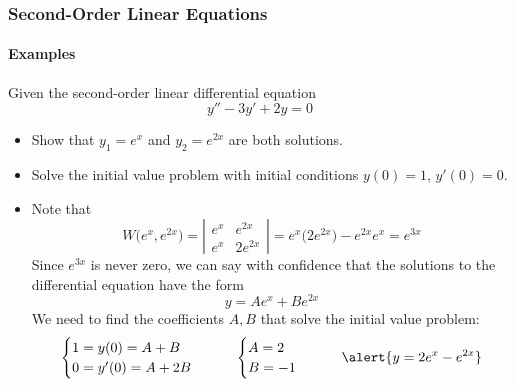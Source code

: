 \documentclass[9pt,xcolor=x11names,compress]{beamer}
\begin{document}
\begin{frame}\frametitle{Second-Order Linear Equations}
\framesubtitle{Examples}
\begin{block}{Given the second-order linear differential equation}
\begin{equation*}
	y''-3y'+2y=0
\end{equation*}
\begin{itemize}
	\item Show that $y_1=e^x$ and $y_2=e^{2x}$ are both solutions.
	\item \alert{Solve the initial value problem with initial conditions $y(0)=1$, $y'(0)=0$.}
\end{itemize}
\end{block}
\begin{itemize}
	\item Note that 
	\begin{equation*}
		W\big(e^x,e^{2x} \big) = \left| \begin{matrix}
			e^x & e^{2x} \\ e^x & 2e^{2x} \end{matrix} \right| = e^x\big( 2e^{2x} \big)-e^{2x}e^x = e^{3x}
	\end{equation*}
	Since $e^{3x}$ is never zero, we can say with confidence that the solutions to the differential equation have the form
	\begin{equation*}
		y=Ae^x+Be^{2x}
	\end{equation*}
	We need to find the coefficients $A,B$ that solve the initial value problem:
	\begin{equation*}
		\begin{cases}
			1=y(0)=A+B\\ 0=y'(0)=A+2B
		\end{cases}\qquad
		\begin{cases}
			A=2 \\ B=-1
		\end{cases}\qquad
		\alert{y=2e^x-e^{2x}}
	\end{equation*}
\end{itemize}

\end{frame}
\end{document}
